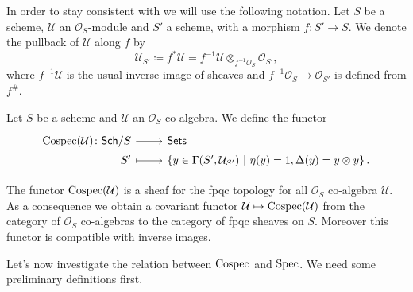 \begin{ntt}[]
	In order to stay consistent with
	\cite{Messing} we will use the following notation.
	Let $S$ be a scheme, $\mathcal{U}$ an $\mathcal{O}_{ S }$-module
	and $S'$ a scheme, with a morphism
	$f\colon S' \to S$.
	We denote the pullback of $\mathcal{U}$ along $f$ by 
	\begin{equation*}
	\mathcal{U}_{S'} \coloneqq f^*\mathcal{U} = 
	f^{-1}\mathcal{U} \otimes_{f^{-1}\mathcal{O}_{ S }} \mathcal{O}_{ S' }
	,\end{equation*}
	where $f^{-1} \mathcal{U}$ is the usual inverse image of sheaves and
	$f^{-1}\mathcal{O}_{ S } \to \mathcal{O}_{ S' }$ is defined from $f^\#$.
\end{ntt}


\begin{defn}[]
	Let $S$ be a scheme and $\mathcal{U}$ an $\mathcal{O}_{ S }$ co-algebra.
	We define the functor 
	\begin{equation*}
	\begin{tikzcd}[row sep = 0ex
		,/tikz/column 1/.append style={anchor=base east}
		,/tikz/column 2/.append style={anchor=base west}]
		\cospec(\mathcal{U})\colon 
		\mathsf{Sch}/S\arrow[r, "", rightarrow] &
		\mathsf{Sets} \\
		S' \arrow[r, "", mapsto] & 
		\left\{ y \in \Gamma(S', \mathcal{U}_{S'}) \ \middle|\ 
		\eta(y) = 1, \Delta(y) = y \otimes y\right\}
	.\end{tikzcd}
	\end{equation*} 
\end{defn}


\begin{rem}
	The functor $\operatorname{Cospec}(\mathcal{U})$ is a sheaf for the fpqc topology
	for all $\mathcal{O}_{ S }$ co-algebra $\mathcal{U}$.
	As a consequence we obtain a covariant functor $\mathcal{U} \mapsto \operatorname{Cospec}(\mathcal{U})$
	from the category of $\mathcal{O}_{ S }$ co-algebras to the category
	of fpqc sheaves on $S$.
	Moreover this functor is compatible with inverse images.
\end{rem}


\noindent
Let's now investigate the relation between $\operatorname{Cospec}$ and $\operatorname{Spec}$.
We need some preliminary definitions first.


